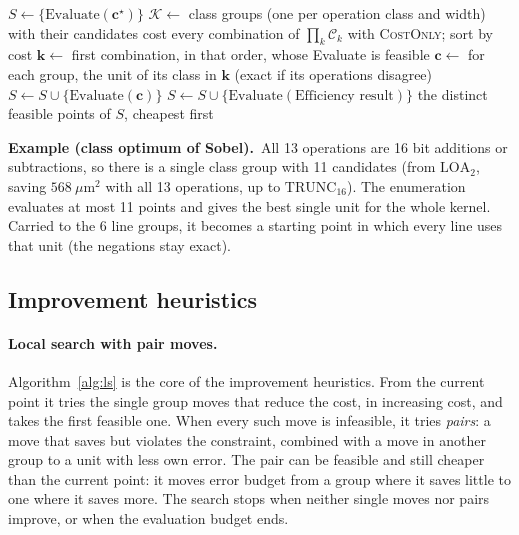 \documentclass[11pt,a4paper]{article}
\newcommand{\examplebox}[2]{\par\medskip\noindent\colorbox{tabAzul!6}{\begin{minipage}{\dimexpr\linewidth-2\fboxsep}
  \textbf{Example (#1).}\ #2\end{minipage}}\par\medskip}
\begin{document}
\begin{algorithm}[H]
\caption{Starting points}\label{alg:seed}
\begin{algorithmic}[1]
\State $S \gets \{ \text{Evaluate}(\mathbf{c}^\star) \}$
\State $\mathcal{K} \gets$ class groups (one per operation class and width) with their candidates
  \State cost every combination of $\prod_k \mathcal{C}_k$ with \textsc{CostOnly}; sort by cost
  \State $\mathbf{k} \gets$ first combination, in that order, whose Evaluate is feasible
  \State $\mathbf{c} \gets$ for each group, the unit of its class in $\mathbf{k}$ (exact if its operations disagree)
  \State $S \gets S \cup \{\text{Evaluate}(\mathbf{c})\}$
\EndIf
\State $S \gets S \cup \{\text{Evaluate}(\text{Efficiency result})\}$
\State \Return the distinct feasible points of $S$, cheapest first
\end{algorithmic}
\end{algorithm}

\examplebox{class optimum of Sobel}{All 13 operations are 16 bit additions or subtractions, so there is a single class
group with 11 candidates (from $\text{LOA}_2$, saving $568\ \mu\text{m}^2$ with all 13 operations, up to
$\text{TRUNC}_{16}$). The enumeration evaluates at most 11 points and gives the best single unit for the whole kernel.
Carried to the 6 line groups, it becomes a starting point in which every line uses that unit (the negations stay
exact).}

\subsection{Improvement heuristics}

\paragraph{Local search with pair moves.} Algorithm~\ref{alg:ls} is the core of the improvement heuristics. From the
current point it tries the single group moves that reduce the cost, in increasing cost, and takes the first feasible
one. When every such move is infeasible, it tries \emph{pairs}: a move that saves but violates the constraint,
combined with a move in another group to a unit with less own error. The pair can be feasible and still cheaper than
the current point: it moves error budget from a group where it saves little to one where it saves more. The search
stops when neither single moves nor pairs improve, or when the evaluation budget ends.
\end{document}
